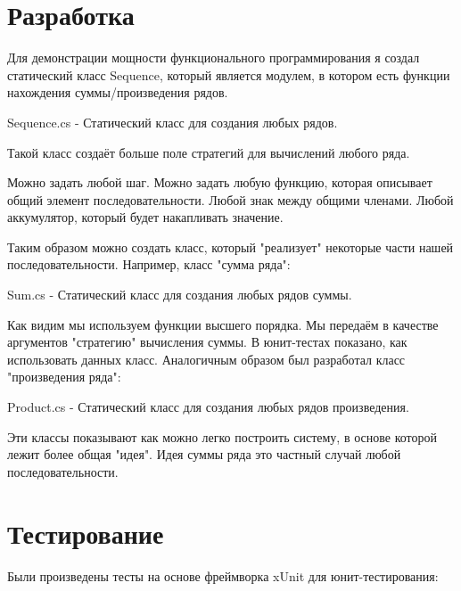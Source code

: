 \newpage
\section{Разработка}

Для демонстрации мощности функционального программирования я создал статический класс Sequence, который является модулем, в котором есть функции нахождения суммы/произведения рядов. 

\begin{code}
	
	\caption{Sequence.cs - Статический класс для создания любых рядов.}
\end{code}

Такой класс создаёт больше поле стратегий для вычислений любого ряда.

Можно задать любой шаг. Можно задать любую функцию, которая описывает общий элемент последовательности. Любой знак между общими членами. Любой аккумулятор, который будет накапливать значение.

Таким образом можно создать класс, который "реализует" некоторые части нашей последовательности. Например, класс "сумма ряда":

\begin{code}
	
	\caption{Sum.cs - Статический класс для создания любых рядов суммы.}
\end{code}

Как видим мы используем функции высшего порядка. Мы передаём в качестве аргументов "стратегию" вычисления суммы.
В юнит-тестах показано, как использовать данных класс.
Аналогичным образом был разработал класс "произведения ряда":

\begin{code}
	
	\caption{Product.cs - Статический класс для создания любых рядов произведения.}
\end{code}

Эти классы показывают как можно легко построить систему, в основе которой лежит более общая "идея".
Идея суммы ряда это частный случай любой последовательности.

\newpage
\section{Тестирование}

Были произведены тесты на основе фреймворка xUnit для юнит-тестирования:

